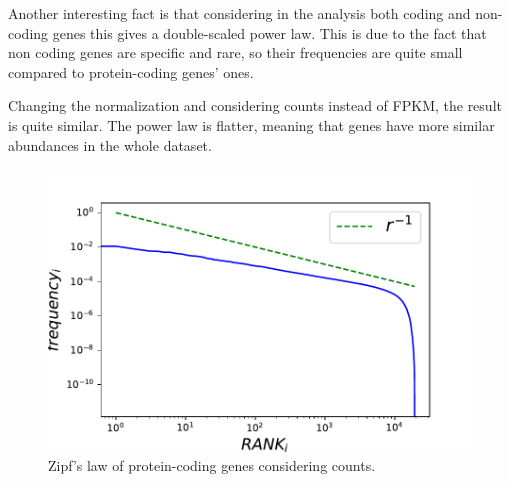 Another interesting fact is that considering in the analysis both coding and non-coding genes this gives a double-scaled power law. This is due to the fact that non coding genes are specific and rare, so their frequencies are quite small compared to protein-coding genes' ones.

Changing the normalization and considering counts instead of FPKM, the result is quite similar. The power law is flatter, meaning that genes have more similar abundances in the whole dataset. 
\begin{figure}[htb!]
    \centering
    \includegraphics[width=0.8\linewidth]{pictures/structure/tcga/globalzipf_counts.pdf}
    \caption{Zipf's law of protein-coding genes considering counts.}
    \label{fig:structure/tcga/globalzipf_count}
\end{figure}

